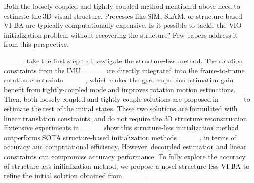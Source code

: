 Both the loosely-coupled and tightly-coupled method mentioned above need to estimate the 3D visual structure. Processes like SfM, SLAM, or structure-based VI-BA are typically computationally expensive. Is it possible to tackle the VIO initialization problem without recovering the structure? Few papers address it from this perspective.

____ take the first step to investigate the structure-less method. The rotation constraints from the IMU ____ are directly integrated into the frame-to-frame rotation constraints ____, which makes the gyroscope bias estimation gain benefit from tightly-coupled mode and improves rotation motion estimations. Then, both loosely-coupled and tightly-couple solutions are proposed in ____ to estimate the rest of the initial states. These two solutions are formulated with linear translation constraints, and do not require the 3D structure reconstruction. Extensive experiments in ____ show this structure-less initialization method outperforms SOTA structure-based initialization methods ____, in terms of accuracy and computational efficiency. However, decoupled estimation and linear constraints can compromise accuracy performance. To fully explore the accuracy of structure-less initialization method, we propose a novel structure-less VI-BA to refine the initial solution obtained from ____.